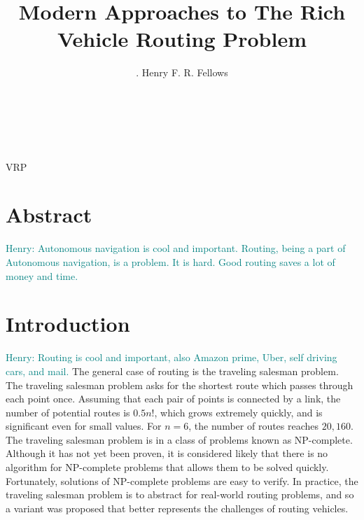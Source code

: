 \documentclass{sig-alternate}
\newcommand{\allcomments}[1]{{#1}}
\newcommand{\hfcomment}[1]{\textcolor{Teal}{\allcomments{Henry: {#1}}}}
\begin{document}

\title{Modern Approaches to The Rich Vehicle Routing Problem}


\author{
.
\alignauthor
Henry F. R. Fellows\\
	\\
	\\
	\\
}

\maketitle
\begin{abstract}
\end{abstract}
VRP



\section{Abstract}
\label{sec:abstract}
\hfcomment{Autonomous navigation is cool and important. Routing, being a part of Autonomous navigation, is a problem. It is hard. Good routing saves a lot of money and time.}
\section{Introduction}
\label{sec:intro}
\hfcomment{Routing is cool and important, also Amazon prime, Uber, self driving cars, and mail.}
The general case of routing is the traveling salesman problem. The traveling salesman problem asks for the shortest route which passes through each point once. Assuming that each pair of points is connected by a link, the number of potential routes is $0.5n!$, which grows extremely quickly, and is significant even for small values. For $n=6$, the number of routes reaches $20,160$. The traveling salesman problem is in a class of problems known as NP-complete. Although it has not yet been proven, it is considered likely that there is no algorithm for NP-complete problems that allows them to be solved quickly. Fortunately, solutions of NP-complete problems are easy to verify. In practice, the traveling salesman problem is to abstract for real-world routing problems, and so a variant was proposed that better represents the challenges of routing vehicles.
\end{document}
